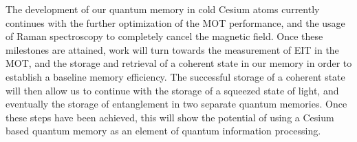The development of our quantum memory in cold Cesium atoms currently continues with the further optimization of the MOT performance, and the usage of Raman spectroscopy to completely cancel the magnetic field.  Once these milestones are attained, work will turn towards the measurement of EIT in the MOT, and the storage and retrieval of a coherent state in our memory in order to establish a baseline memory efficiency.  The successful storage of a coherent state will then allow us to continue with the storage of a squeezed state of light, and eventually the storage of entanglement in two separate quantum memories.  Once these steps have been achieved, this will show the potential of using a Cesium based quantum memory as an element of quantum information processing.

